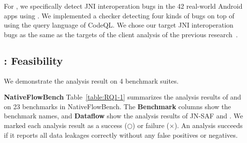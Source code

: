 For , we specifically detect JNI interoperation bugs in the 42 real-world Android
apps using \ours. We implemented a checker detecting four kinds of
bugs on top of \ours using the query language of CodeQL. We chose our target
JNI interoperation bugs as the same as the targets of the client
analysis of the previous research~\cite{LeeASE20, ILEA}.

\subsection{: Feasibility}
We demonstrate the analysis result on 4 benchmark suites.

\textbf{NativeFlowBench} Table~\ref{table:RQ1-1} summarizes the analysis results of \ours and \jnsaf on 23 benchmarks in NativeFlowBench.
The {\bf Benchmark} columns show the benchmark names,
and {\bf Dataflow} show the analysis results of JN-SAF and \ours.
We marked each analysis result as a success ($\bigcirc$) or failure ($\times$).
An analysis succeeds if it reports all data leakages correctly without any false positives or negatives.




